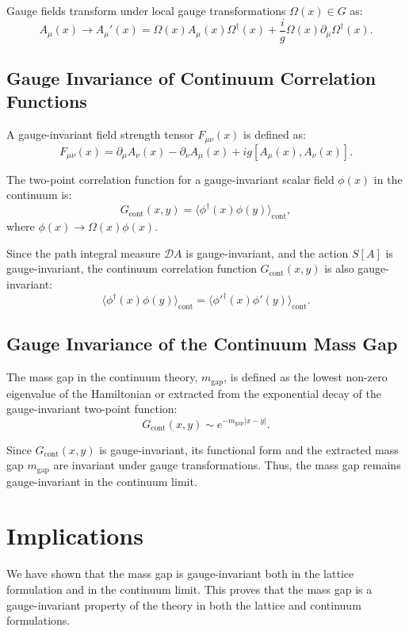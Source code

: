 Gauge fields transform under local gauge transformations \(\Omega(x) \in G\) as:
\begin{equation}
A_\mu(x) \rightarrow A_\mu'(x) = \Omega(x) A_\mu(x) \Omega^\dagger(x) + \frac{i}{g} \Omega(x) \partial_\mu \Omega^\dagger(x).
\end{equation}

\subsection{Gauge Invariance of Continuum Correlation Functions}

A gauge-invariant field strength tensor \(F_{\mu\nu}(x)\) is defined as:
\begin{equation}
F_{\mu\nu}(x) = \partial_\mu A_\nu(x) - \partial_\nu A_\mu(x) + i g [A_\mu(x), A_\nu(x)].
\end{equation}

The two-point correlation function for a gauge-invariant scalar field \(\phi(x)\) in the continuum is:
\begin{equation}
G_{\text{cont}}(x, y) = \langle \phi^\dagger(x) \phi(y) \rangle_{\text{cont}},
\end{equation}
where \(\phi(x) \rightarrow \Omega(x) \phi(x)\).

Since the path integral measure \(\mathcal{D}A\) is gauge-invariant, and the action \(S[A]\) is gauge-invariant, the continuum correlation function \(G_{\text{cont}}(x, y)\) is also gauge-invariant:
\begin{equation}
\langle \phi^\dagger(x) \phi(y) \rangle_{\text{cont}} = \langle \phi'^\dagger(x) \phi'(y) \rangle_{\text{cont}}.
\end{equation}

\subsection{Gauge Invariance of the Continuum Mass Gap}

The mass gap in the continuum theory, \(m_{\text{gap}}\), is defined as the lowest non-zero eigenvalue of the Hamiltonian or extracted from the exponential decay of the gauge-invariant two-point function:
\begin{equation}
G_{\text{cont}}(x, y) \sim e^{-m_{\text{gap}} |x-y|}.
\end{equation}

Since \(G_{\text{cont}}(x, y)\) is gauge-invariant, its functional form and the extracted mass gap \(m_{\text{gap}}\) are invariant under gauge transformations. Thus, the mass gap remains gauge-invariant in the continuum limit.



\section{Implications}

We have shown that the mass gap is gauge-invariant both in the lattice formulation and in the continuum limit. This proves that the mass gap is a gauge-invariant property of the theory in both the lattice and continuum formulations.
